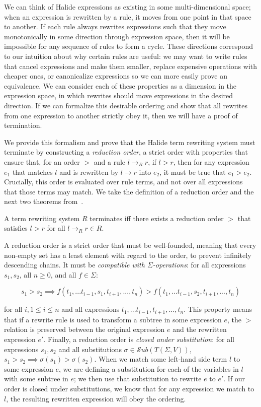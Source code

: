 \documentclass[acmsmall,review,anonymous]{acmart}\settopmatter{printfolios=true,printccs=false,printacmref=false}
\begin{document}
We can think of Halide expressions as existing in some multi-dimensional space; when an expression is rewritten by a rule, it moves from one point in that space to another. If each rule always rewrites expressions such that they move monotonically in some direction through expression space, then it will be impossible for any sequence of rules to form a cycle. These directions correspond to our intuition about why certain rules are useful: we may want to write rules that cancel expressions and make them smaller, replace expensive operations with cheaper ones, or canonicalize expressions so we can more easily prove an equivalence. We can consider each of these properties as a dimension in the expression space, in which rewrites should move expressions in the desired direction. If we can formalize this desirable ordering and show that all rewrites from one expression to another strictly obey it, then we will have a proof of termination.

We provide this formalism and prove that the Halide term rewriting system must terminate by constructing a \emph{reduction order}, a strict order with properties that ensure that, for an order $>$ and a rule $l \rightarrow_R r$, if $l > r$, then for any expression $e_1$ that matches $l$ and is rewritten by $l \rightarrow r$ into $e_2$, it must be true that $e_1 > e_2$. Crucially, this order is evaluated over rule terms, and not over all expressions that those terms may match. We take the definition of a reduction order and the next two theorems from~\cite{baader1999term}.

\begin{theorem}\label{theorem:terminates}
A term rewriting system $R$ terminates iff there exists a reduction order $>$ that satisfies $l > r$ for all $l \rightarrow_R r \in R$.
\end{theorem}

A reduction order is a strict order that must be well-founded, meaning that every non-empty set has a least element with regard to the order, to prevent infinitely descending chains. It must be \emph{compatible with $\Sigma$-operations}: for all expressions $s_1, s_2$, all $n \geq 0$, and all $f \in \Sigma$:

\[
s_1 > s_2 \implies f(t_1,...t_{i-1},s_1,t_{i+1},...,t_n) > f(t_1,...t_{i-1},s_2,t_{i+1},...,t_n)
\]

for all $i, 1 \leq i \leq n$ and all expressions $t_1,...t_{i-1},t_{i+1},...,t_n$. This property means that if a rewrite rule is used to transform a subtree in some expression $e$, the $>$ relation is preserved between the original expression $e$ and the rewritten expression $e'$. Finally, a reduction order is \emph{closed under substitution}: for all expressions $s_1, s_2$ and all substitutions $\sigma \in \mathcal{S}ub(T(\Sigma,V))$, 
$s_1 > s_2 \implies \sigma(s_1) > \sigma(s_2)$. When we match some left-hand side term $l$ to some expression $e$, we are defining a substitution for each of the variables in $l$ with some subtree in $e$; we then use that substitution to rewrite $e$ to $e'$. If our order is closed under substitutions, we know that for any expression we match to $l$, the resulting rewritten expression will obey the ordering.
\end{document}
